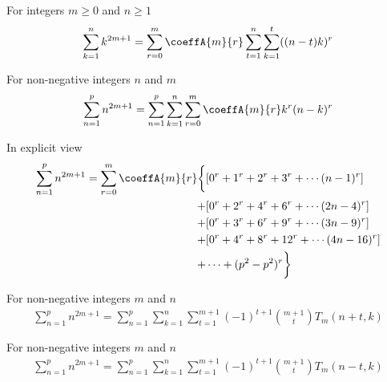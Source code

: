 \begin{corollary}
    \label{cor:sums-of-odd-powers-compact-form-reindexed}
    For integers $m\geq 0$ and $n \geq 1$
    \begin{align*}
        \sum_{k=1}^{n} k^{2m+1}
        = \sum_{r=0}^{m} \coeffA{m}{r} \sum_{t=1}^{n} \sum_{k=1}^{t} ((n-t)k)^r
    \end{align*}
\end{corollary}

\begin{proposition}
    \label{prop:sums-of-odd-powers-triple}
    For non-negative integers $n$ and $m$
    \begin{align*}
        \sum_{n=1}^{p} n^{2m+1} = \sum_{n=1}^{p} \sum_{k=1}^{n} \sum_{r=0}^{m} \coeffA{m}{r} k^r (n-k)^r
    \end{align*}
\end{proposition}
In explicit view
\begin{align*}
    \sum_{n=1}^{p} n^{2m+1} = \sum_{r=0}^{m} \coeffA{m}{r} \bigg \{
    &[0^r + 1^r + 2^r + 3^r + \cdots (n-1)^r] \\
    + &[0^r + 2^r + 4^r + 6^r + \cdots (2n-4)^r] \\
    + &[0^r + 3^r + 6^r + 9^r + \cdots (3n-9)^r] \\
    + &[0^r + 4^r + 8^r + 12^r + \cdots (4n-16)^r] \\
    + &\cdots + (p^2 - p^2)^r
    \bigg \}
\end{align*}

\begin{proposition}
    \label{prop:sums-of-odd-power-decomposition-forward}
    For non-negative integers $m$ and $n$
    \begin{align*}
        \sum_{n=1}^{p} n^{2m+1} = \sum_{n=1}^{p} \sum_{k=1}^{n} \sum_{t=1}^{m+1} (-1)^{t+1} \binom{m+1}{t} T_{m} (n+t, k)
    \end{align*}
\end{proposition}

\begin{proposition}
    \label{prop:sums-of-odd-power-decomposition-backward}
    For non-negative integers $m$ and $n$
    \begin{align*}
        \sum_{n=1}^{p} n^{2m+1} = \sum_{n=1}^{p} \sum_{k=1}^{n} \sum_{t=1}^{m+1} (-1)^{t+1} \binom{m+1}{t} T_{m} (n-t, k)
    \end{align*}
\end{proposition}

